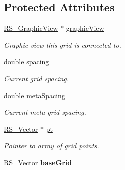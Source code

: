 \subsection*{Protected Attributes}
\begin{DoxyCompactItemize}
\item 
\hypertarget{classRS__Grid_aaf666d44cca6b7efdaba71632e4823f7}{\hyperlink{classRS__GraphicView}{R\-S\-\_\-\-Graphic\-View} $\ast$ \hyperlink{classRS__Grid_aaf666d44cca6b7efdaba71632e4823f7}{graphic\-View}}\label{classRS__Grid_aaf666d44cca6b7efdaba71632e4823f7}

\begin{DoxyCompactList}\small\item\em Graphic view this grid is connected to. \end{DoxyCompactList}\item 
\hypertarget{classRS__Grid_ad51345a9e6e9c900c3aa493751dae264}{double \hyperlink{classRS__Grid_ad51345a9e6e9c900c3aa493751dae264}{spacing}}\label{classRS__Grid_ad51345a9e6e9c900c3aa493751dae264}

\begin{DoxyCompactList}\small\item\em Current grid spacing. \end{DoxyCompactList}\item 
\hypertarget{classRS__Grid_a62b8893ade00d246a7f3a013895adb5b}{double \hyperlink{classRS__Grid_a62b8893ade00d246a7f3a013895adb5b}{meta\-Spacing}}\label{classRS__Grid_a62b8893ade00d246a7f3a013895adb5b}

\begin{DoxyCompactList}\small\item\em Current meta grid spacing. \end{DoxyCompactList}\item 
\hypertarget{classRS__Grid_afb0c86ce9a55a543252b81fad7a009af}{\hyperlink{classRS__Vector}{R\-S\-\_\-\-Vector} $\ast$ \hyperlink{classRS__Grid_afb0c86ce9a55a543252b81fad7a009af}{pt}}\label{classRS__Grid_afb0c86ce9a55a543252b81fad7a009af}

\begin{DoxyCompactList}\small\item\em Pointer to array of grid points. \end{DoxyCompactList}\item 
\hypertarget{classRS__Grid_ac4ac9e36c217f0573b4613d7e9136b1f}{\hyperlink{classRS__Vector}{R\-S\-\_\-\-Vector} {\bfseries base\-Grid}}\label{classRS__Grid_ac4ac9e36c217f0573b4613d7e9136b1f}


\end{DoxyCompactItemize}
